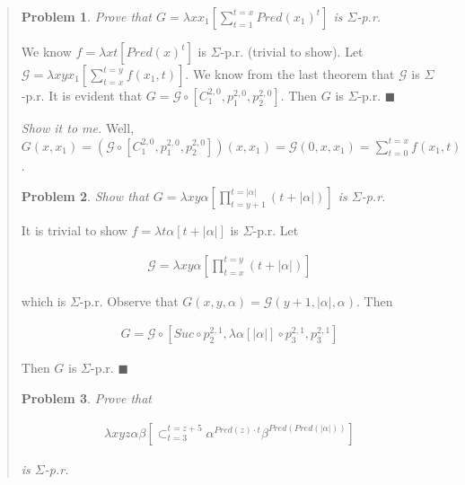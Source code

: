 \documentclass[a4paper, 12pt]{article}
\newtheorem{problem}{Problem}
\newtheorem{problem}{Problem}
\begin{document}
\small
\begin{quote}


\begin{problem}
    Prove that $G = \lambda x x_1 \left[ \sum_{t=1}^{t=x} Pred(x_1)^t \right] $ is
    $\Sigma$-p.r.
\end{problem}

We know $f = \lambda xt \left[ Pred(x)^t \right] $ is $\Sigma$-p.r. (trivial to
show). Let $\mathcal{G} = \lambda xy x_1 \left[ \sum_{t=x}^{t=y} f(x_1, t)
\right] $. We know from the last theorem that $\mathcal{G}$ is $\Sigma$-p.r. It
is evident that $G = \mathcal{G} \circ
\left[ C_1^{2, 0}, p_{1}^{2, 0}, p_{2}^{2, 0} \right] $. Then $G$ is
$\Sigma$-p.r. $\blacksquare$

\textit{Show it to me.} Well, $G(x, x_1) = \left( \mathcal{G} \circ \left[
C_{1}^{2, 0}, p_1^{2, 0}, p_2^{2, 0} \right]  \right)(x, x_1) = \mathcal{G}(0,
x, x_1) = \sum_{t=0}^{t=x} f(x_1, t)$.

\begin{problem}
    Show that $G = \lambda xy\alpha \left[ \prod_{t = y+1}^{t = |\alpha|} (t + |\alpha|)
    \right] $ is $\Sigma$-p.r.
\end{problem}

It is trivial to show $f = \lambda t\alpha \left[ t + |\alpha| \right] $ is
$\Sigma$-p.r. Let 

\begin{align*}
    \mathcal{G} = \lambda xy \alpha \left[ \prod_{t=x}^{t = y} (t + |\alpha|) \right] 
\end{align*}

which is $\Sigma$-p.r. Observe that $G(x, y, \alpha) = \mathcal{G}(y + 1,
|\alpha|,
\alpha)$. Then 

\begin{align*}
    G = \mathcal{G} \circ \left[ Suc \circ p_2^{2, 1}, \lambda \alpha[|\alpha|]
    \circ p_{3}^{2, 1}, p_3^{2, 1} \right]
\end{align*}

Then $G$ is $\Sigma$-p.r. $\blacksquare$

\begin{problem}
Prove that 

\begin{align*} \lambda xyz\alpha\beta \left[ \mathop{\subset}_{t=3}^{t=z+5}
    \alpha^{Pred(z) \cdot t} \beta^{Pred\left( Pred\left( |\alpha| \right)
\right) } \right] 
\end{align*}

is $\Sigma$-p.r.
\end{problem}


\end{quote}
\end{document}

